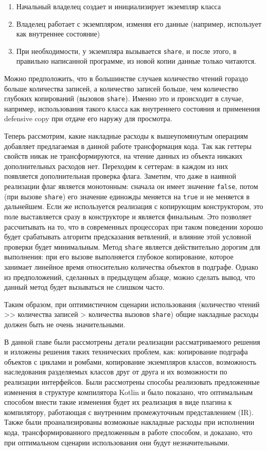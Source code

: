 \documentclass[specification,annotation,times]{itmo-student-thesis}
\begin{document}
\begin{enumerate}
	\item Начальный владелец создает и инициализирует экземпляр класса
	\item Владелец работает с экземпляром, изменяя его данные (например, использует как внутреннее состояние)
	\item При необходимости, у экземпляра вызывается \texttt{share}, и после этого, в правильно написанной программе, из новой копии данные только читаются.
\end{enumerate}


Можно предположить, что в большинстве случаев количество чтений гораздо больше количества записей, а количество записей больше, чем количество глубоких копирований (вызовов \texttt{share}).
Именно это и происходит в случае, например, использования такого класса как внутреннего состояния и применения defensive copy при отдаче его наружу для просмотра.

Теперь рассмотрим, какие накладные расходы к вышеупомянутым операциям добавляет предлагаемая в данной работе трансформация кода.
Так как геттеры свойств никак не трансформируются, на чтение данных из объекта никаких дополнительных расходов нет.
Переходим к сеттерам: в каждом из них появляется дополнительная проверка флага. Заметим, что даже в наивной реализации флаг является монотонным: сначала он имеет значение \texttt{false}, потом (при вызове \texttt{share}) его значение единожды меняется на \texttt{true} и не меняется в дальнейшем.
Если же используется реализация с копирующим конструктором, это поле выставляется сразу в конструкторе и является финальным.
Это позволяет рассчитывать на то, что в современных процессорах при таком поведении хорошо будет срабатывать алгоритм предсказания ветвлений, и влияние этой условной проверки будет минимальным.
Метод \texttt{share} является действительно дорогим для выполнения: при его вызове выполняется глубокое копирование, которое занимает линейное время относительно количества объектов в подграфе. Однако из предположений, сделанных в предыдущем абзаце, можно сделать вывод, что данный метод будет вызываться не слишком часто.

Таким образом, при оптимистичном сценарии использования (количество чтений >{}> количества записей > количества вызовов \texttt{share})
общие накладные расходы должен быть не очень значительными.


\chapterconclusion

В данной главе были рассмотрены детали реализации рассматриваемого решения и изложены решения таких технических проблем, как: копирование подграфа объектов с циклами и ромбами, копирование экземпляров классов, возможность наследования разделяемых классов друг от друга и их возможности по реализации интерфейсов.
Были рассмотрены способы реализовать предложенные изменения в структуре компилятора Kotlin и было показано, что оптимальным способом внести такие изменения будет их реализация в виде плагина к компилятору, работающая с внутренним промежуточным представлением (IR).
Также были проанализированы возможные накладные расходы при исполнении кода, трансформированного предложенным в работе способом, и доказано, что при оптимальном сценарии использования они будут незначительными.  
\end{document}
